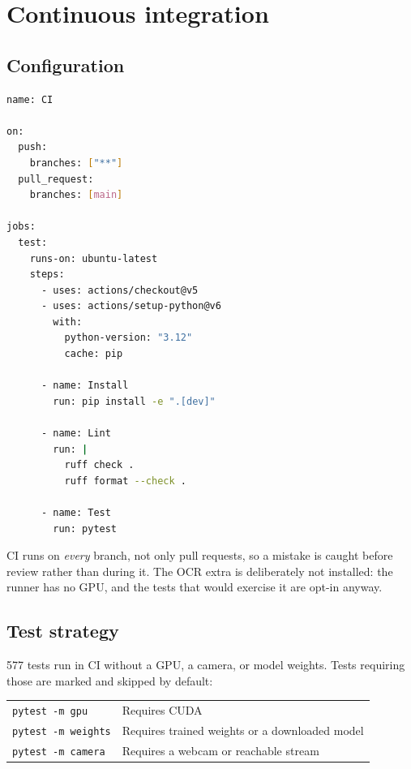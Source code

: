 \documentclass[11pt,a4paper]{article}
\begin{document}
\section{Continuous integration}

\subsection{Configuration}

\begin{lstlisting}[language=bash, caption={\texttt{.github/workflows/ci.yml}}]
name: CI

on:
  push:
    branches: ["**"]
  pull_request:
    branches: [main]

jobs:
  test:
    runs-on: ubuntu-latest
    steps:
      - uses: actions/checkout@v5
      - uses: actions/setup-python@v6
        with:
          python-version: "3.12"
          cache: pip

      - name: Install
        run: pip install -e ".[dev]"

      - name: Lint
        run: |
          ruff check .
          ruff format --check .

      - name: Test
        run: pytest
\end{lstlisting}

CI runs on \emph{every} branch, not only pull requests, so a mistake is caught
before review rather than during it. The OCR extra is deliberately not installed:
the runner has no GPU, and the tests that would exercise it are opt-in anyway.

\subsection{Test strategy}

577 tests run in CI without a GPU, a camera, or model weights. Tests requiring
those are marked and skipped by default:

\begin{center}
\small
\begin{tabular}{@{}ll@{}}
\toprule
\texttt{pytest -m gpu} & Requires CUDA \\
\texttt{pytest -m weights} & Requires trained weights or a downloaded model \\
\texttt{pytest -m camera} & Requires a webcam or reachable stream \\
\bottomrule
\end{tabular}
\end{center}
\end{document}
